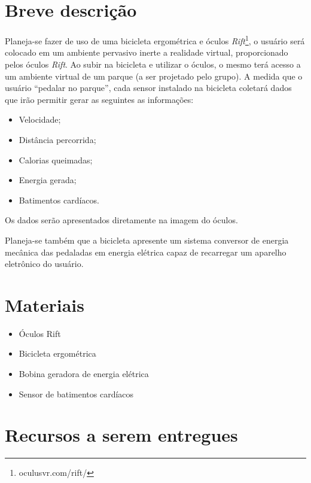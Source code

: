\section{Breve descrição}\label{sec}

Planeja-se fazer de uso de  uma bicicleta ergométrica e óculos
\textit{Rift}\footnote{oculusvr.com/rift/}, o usuário será colocado em um 
ambiente pervasivo inerte a realidade virtual, proporcionado pelos óculos 
\textit{Rift}. Ao subir na bicicleta e utilizar o óculos, o mesmo terá acesso 
a um ambiente virtual de um parque (a ser projetado pelo grupo). A medida que 
o usuário “pedalar no parque”, cada sensor instalado na bicicleta coletará 
dados que irão permitir gerar as seguintes as informações:
\begin{itemize}
	\item Velocidade;
	\item Distância percorrida;
	\item Calorias queimadas;
	\item Energia gerada;
	\item Batimentos cardíacos.
\end{itemize}

Os dados serão apresentados diretamente na imagem do óculos. 

Planeja-se também que a bicicleta apresente um sistema conversor de
energia mecânica das pedaladas em energia elétrica capaz de recarregar um aparelho eletrônico do usuário.


\section{Materiais} %
\label{sec:materiais}

\begin{itemize}%
	\item Óculos Rift \checkmark
	\item Bicicleta ergométrica \checkmark
	\item Bobina geradora de energia elétrica
	\item Sensor de batimentos cardíacos 
\end{itemize}

\section{Recursos a serem entregues}

